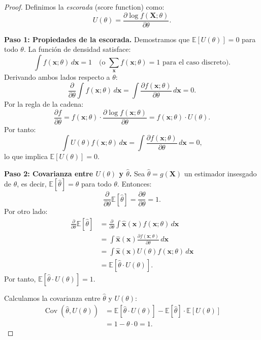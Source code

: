 \documentclass[11pt,a4paper]{article}
\theoremstyle{plain}
\theoremstyle{definition}
\begin{document}
\begin{proof}
Definimos la \textit{escorada} (score function) como:
\[
U(\theta) = \frac{\partial \log f(\mathbf{X}; \theta)}{\partial \theta}.
\]

\textbf{Paso 1: Propiedades de la escorada.}
Demostramos que $\mathbb{E}[U(\theta)] = 0$ para todo $\theta$. La función de densidad satisface:
\[
\int f(\mathbf{x}; \theta) \, d\mathbf{x} = 1 \quad \text{(o } \sum_{\mathbf{x}} f(\mathbf{x}; \theta) = 1 \text{ para el caso discreto)}.
\]
Derivando ambos lados respecto a $\theta$:
\[
\frac{\partial}{\partial \theta} \int f(\mathbf{x}; \theta) \, d\mathbf{x} = \int \frac{\partial f(\mathbf{x}; \theta)}{\partial \theta} \, d\mathbf{x} = 0.
\]
Por la regla de la cadena:
\[
\frac{\partial f}{\partial \theta} = f(\mathbf{x}; \theta) \cdot \frac{\partial \log f(\mathbf{x}; \theta)}{\partial \theta} = f(\mathbf{x}; \theta) \cdot U(\theta).
\]
Por tanto:
\[
\int U(\theta) f(\mathbf{x}; \theta) \, d\mathbf{x} = \int \frac{\partial f(\mathbf{x}; \theta)}{\partial \theta} \, d\mathbf{x} = 0,
\]
lo que implica $\mathbb{E}[U(\theta)] = 0$.

\textbf{Paso 2: Covarianza entre $U(\theta)$ y $\hat{\theta}$.}
Sea $\hat{\theta} = g(\mathbf{X})$ un estimador insesgado de $\theta$, es decir, $\mathbb{E}[\hat{\theta}] = \theta$ para todo $\theta$. Entonces:
\[
\frac{\partial}{\partial \theta} \mathbb{E}[\hat{\theta}] = \frac{\partial \theta}{\partial \theta} = 1.
\]
Por otro lado:
\begin{align*}
\frac{\partial}{\partial \theta} \mathbb{E}[\hat{\theta}] &= \frac{\partial}{\partial \theta} \int \hat{\mathbf{x}}(\mathbf{x}) f(\mathbf{x}; \theta) \, d\mathbf{x} \\
&= \int \hat{\mathbf{x}}(\mathbf{x}) \frac{\partial f(\mathbf{x}; \theta)}{\partial \theta} \, d\mathbf{x} \\
&= \int \hat{\mathbf{x}}(\mathbf{x}) U(\theta) f(\mathbf{x}; \theta) \, d\mathbf{x} \\
&= \mathbb{E}[\hat{\theta} \cdot U(\theta)].
\end{align*}
Por tanto, $\mathbb{E}[\hat{\theta} \cdot U(\theta)] = 1$.

Calculamos la covarianza entre $\hat{\theta}$ y $U(\theta)$:
\begin{align*}
\operatorname{Cov}(\hat{\theta}, U(\theta)) &= \mathbb{E}[\hat{\theta} \cdot U(\theta)] - \mathbb{E}[\hat{\theta}] \cdot \mathbb{E}[U(\theta)] \\
&= 1 - \theta \cdot 0 = 1.
\end{align*}


\end{proof}
\end{document}
